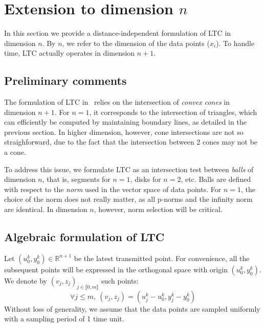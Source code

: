 \documentclass[10pt, conference, compsocconf]{IEEEtran}
\newcommand{\todo}[1]{\marginpar{\parbox{18mm}{\flushleft\tiny\color{red}\textbf{TODO}:
      #1}}}
\begin{document}


\section{Extension to dimension $n$}

In this section we provide a distance-independent formulation of LTC in 
dimension $n$. By $n$, we refer to the dimension of the data points 
($x_i$). To handle time, LTC actually operates in dimension 
$n+1$. 

\subsection{Preliminary comments}

The formulation of LTC in~\cite{schoellhammer2004lightweight} relies on 
the intersection of \emph{convex cones} in dimension $n+1$. For $n=1$, it 
corresponds to the intersection of triangles, which can efficiently be 
computed by maintaining boundary lines, as detailed in the previous 
section. In higher dimension, however, cone intersections are not so 
straighforward, due to the fact that the intersection between 2 cones 
may not be a cone.

To address this issue, we formulate LTC as an intersection test between 
\emph{balls} of dimension $n$, that is, segments for $n=1$, disks for 
$n=2$, etc. Balls are defined with respect to the \emph{norm} used in 
the vector space of data points. For $n=1$, the choice of the norm does 
not really matter, as all p-norms and the infinity norm are identical. 
In dimension $n$, however, norm selection will be critical.

\subsection{Algebraic formulation of LTC}

Let $(u_0^k, y_0^k) \in \mathbb{R}^{n+1}$ be the latest transmitted point. For convenience, all the subsequent points will be 
expressed in the orthogonal space with origin $(u_0^k, y_0^k)$. We denote by $(v_j, z_j)_{j \in \llbracket 0, m \rrbracket}$ such points:
\begin{equation*}
\forall j \leq m,\  (v_j, z_j) = (u_j^k - u_0^k, y_j^k - y_0^k)
\end{equation*}
Without loss of 
generality, we assume that the data points are sampled uniformly with a 
sampling period of 1 time unit.
\end{document}
